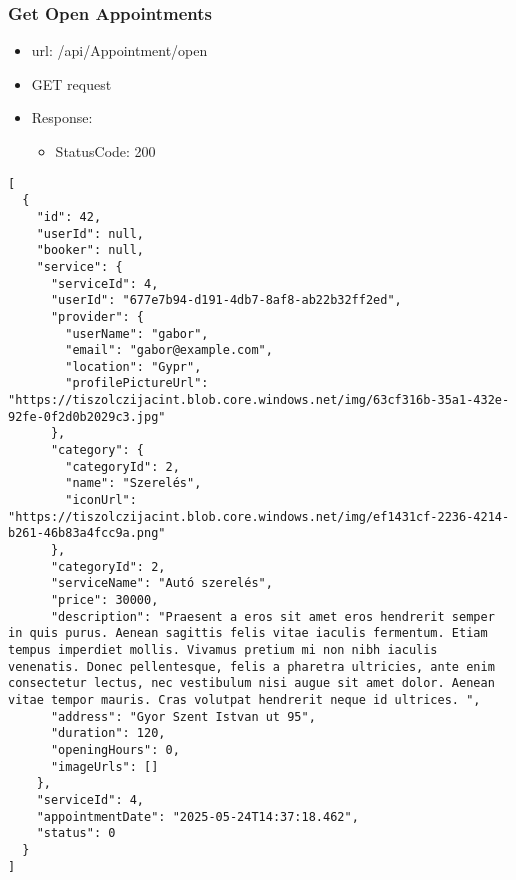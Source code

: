\documentclass[11pt]{article}
\begin{document}
\subsubsection{Get Open Appointments}
\label{sec:org16d9d11}
\begin{itemize}
\item url: /api/Appointment/open
\item GET request
\item Response:
\begin{itemize}
\item StatusCode: 200
\end{itemize}
\end{itemize}
\begin{verbatim}
[
  {
    "id": 42,
    "userId": null,
    "booker": null,
    "service": {
      "serviceId": 4,
      "userId": "677e7b94-d191-4db7-8af8-ab22b32ff2ed",
      "provider": {
        "userName": "gabor",
        "email": "gabor@example.com",
        "location": "Gypr",
        "profilePictureUrl": "https://tiszolczijacint.blob.core.windows.net/img/63cf316b-35a1-432e-92fe-0f2d0b2029c3.jpg"
      },
      "category": {
        "categoryId": 2,
        "name": "Szerelés",
        "iconUrl": "https://tiszolczijacint.blob.core.windows.net/img/ef1431cf-2236-4214-b261-46b83a4fcc9a.png"
      },
      "categoryId": 2,
      "serviceName": "Autó szerelés",
      "price": 30000,
      "description": "Praesent a eros sit amet eros hendrerit semper in quis purus. Aenean sagittis felis vitae iaculis fermentum. Etiam tempus imperdiet mollis. Vivamus pretium mi non nibh iaculis venenatis. Donec pellentesque, felis a pharetra ultricies, ante enim consectetur lectus, nec vestibulum nisi augue sit amet dolor. Aenean vitae tempor mauris. Cras volutpat hendrerit neque id ultrices. ",
      "address": "Gyor Szent Istvan ut 95",
      "duration": 120,
      "openingHours": 0,
      "imageUrls": []
    },
    "serviceId": 4,
    "appointmentDate": "2025-05-24T14:37:18.462",
    "status": 0
  }
]
\end{verbatim}
\end{document}
